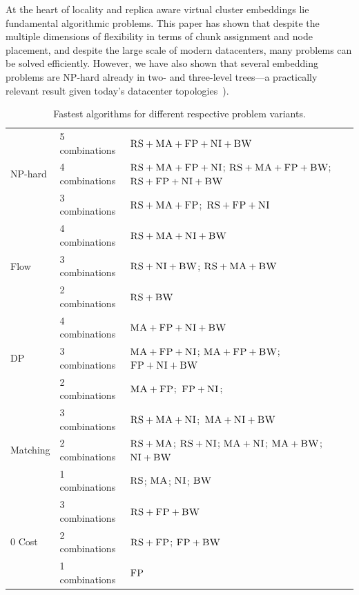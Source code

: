 \documentclass[preprint,12pt]{elsarticle}
\newcommand{\CC}{\textsc{NI}}
\newcommand{\FP}{\textsc{FP}}
\newcommand{\RS}{\textsc{RS}}
\newcommand{\BW}{\textsc{BW}}
\newcommand{\MA}{\textsc{MA}}
\begin{document}
At the heart of locality and replica aware virtual cluster embeddings lie fundamental algorithmic problems.
This paper has shown that despite the
multiple dimensions of flexibility in terms of chunk assignment and node placement, 
and despite the large scale of modern datacenters, 
many problems can be solved efficiently. However, we have also
shown that several embedding problems are NP-hard already in two-
and three-level trees---a practically relevant result given today's datacenter topologies~\cite{fattree}).
\begin{table}
\tiny
\bgroup
\def\arraystretch{1.5}
\begin{small}
\begin{tabular}{|l|l|p{6.5cm}|}
\hline
\multirow{3}{*}{NP-hard} & 5 combinations & \mbox{$\RS+\MA+\FP+\CC+\BW$}\\
\cline{2-3}
 & 4 combinations &  \mbox{$\RS+\MA+\FP+\CC$}; \mbox{$\RS+\MA+\FP+\BW$};
\mbox{$\RS+\FP+\CC+\BW$} \\ \cline{2-3}
 & 3 combinations &\mbox{$\RS+\MA+\FP$};~\mbox{$\RS+\FP+\CC$} \\
 \hline
 \hline
\multirow{3}{*}{Flow} & 4 combinations & \mbox{$\RS+\MA+\CC+\BW$} \\ \cline{2-3}
 & 3 combinations & \mbox{$\RS+\CC+\BW$}; \mbox{$\RS+\MA+\BW$}    \\ \cline{2-3}
 & 2 combinations &$\RS+\BW$ \\
 \hline
 \hline
\multirow{3}{*}{DP} & 4 combinations & \mbox{$\MA+\FP+\CC+\BW$} \\ \cline{2-3}
 & 3 combinations &   \mbox{$\MA+\FP+\CC$};
\mbox{$\MA+\FP+\BW$}; \mbox{$\FP+\CC+\BW$} \\ \cline{2-3}
 & 2 combinations & \mbox{$\MA+\FP$};~\mbox{$\FP+\CC$}; \\
 \hline
 \hline
\multirow{3}{*}{Matching} &3 combinations&
\mbox{$\RS+\MA+\CC$};~\mbox{$\MA+\CC+\BW$}  \\
\cline{2-3}
 & 2 combinations & \mbox{$\RS+\MA$};
\mbox{$\RS+\CC$}; \mbox{$\MA+\CC$};
\mbox{$\MA+\BW$}; \mbox{$\CC+\BW$} \\ \cline{2-3}
& 1 combinations & \mbox{$\RS$}; \mbox{$\MA$};
\mbox{$\CC$}; \mbox{$\BW$}\\
 \hline
 \hline
 \multirow{3}{*}{0 Cost} & 3 combinations & \mbox{$\RS+\FP+\BW$}\\
\cline{2-3}
 & 2 combinations & \mbox{$\RS+\FP$}; \mbox{$\FP+\BW$}\\ \cline{2-3}
 & 1 combinations & \mbox{$\FP$}\\
 \hline
\end{tabular}
\end{small}
\caption{
Fastest algorithms for different respective problem variants.
}
\vspace{-2em}
\label{tab:summary}
\egroup
\end{table}
\end{document}
